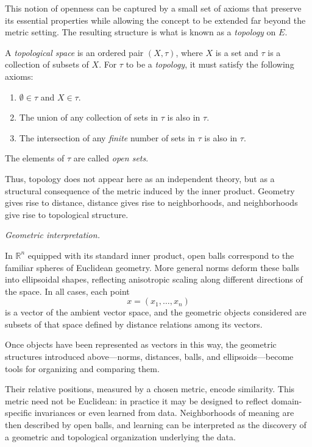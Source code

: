 \medskip

This notion of openness can be captured by a small set of axioms that
preserve its essential properties while allowing the concept to be extended
far beyond the metric setting.
The resulting structure is what is known as a \textit{topology} on $E$.

\medskip

A \textit{topological space} is an ordered pair $(X, \tau)$, where $X$ is a
set and $\tau$ is a collection of subsets of $X$.
For $\tau$ to be a \textit{topology}, it must satisfy the following axioms:

\begin{enumerate}
    \item $\emptyset \in \tau$ and $X \in \tau$.
    \item The union of any collection of sets in $\tau$ is also in $\tau$.
    \item The intersection of any \textit{finite} number of sets in $\tau$ is
    also in $\tau$.
\end{enumerate}

The elements of $\tau$ are called \textit{open sets}.

\medskip

Thus, topology does not appear here as an independent theory, but as a
structural consequence of the metric induced by the inner product.
Geometry gives rise to distance, distance gives rise to neighborhoods, and
neighborhoods give rise to topological structure.

\medskip

\textit{Geometric interpretation.}

In $\mathbb{R}^n$ equipped with its standard inner product, open balls
correspond to the familiar spheres of Euclidean geometry.
More general norms deform these balls into ellipsoidal shapes, reflecting
anisotropic scaling along different directions of the space.
In all cases, each point
\[
x = (x_1,\dots,x_n)
\]
is a vector of the ambient vector space, and the geometric objects considered
are subsets of that space defined by distance relations among its vectors.

\medskip

Once objects have been represented as vectors in this way, the geometric
structures introduced above---norms, distances, balls, and ellipsoids---become
tools for organizing and comparing them.

\medskip

Their relative positions, measured by a chosen metric, encode similarity.
This metric need not be Euclidean: in practice it may be designed to reflect
domain-specific invariances or even learned from data.
Neighborhoods of meaning are then described by open balls, and learning can be
interpreted as the discovery of a geometric and topological organization
underlying the data.

